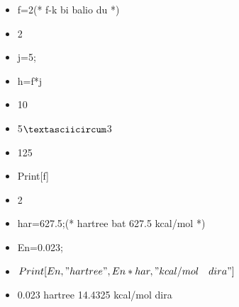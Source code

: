 \documentclass[xcolor=x11names,table]{beamer}
\begin{document}
\begin{frame}[fragile]
\begin{mdframed}[backgroundcolor=gray!05,roundcorner=2pt]
	\begin{itemize}
		\item<1-> f=2(* f-k bi balio du *)

		\item<2-> 2
		\item<3-> j=5;
		\item<3-> h=f*j

		\item<4-> 10

		\item<5-> 5$\textasciicircum$3

		\item<6-> 125

		\item<7-> Print[f]
		\item<8-> 2


		\item<9-> har=627.5;(* hartree bat 627.5 kcal/mol *)
		\item<9-> En=0.023;
		\item<9-> $ Print[En, " hartree ", En*har, " kcal/mol\quad dira "] $

		\item<10-> 0.023 hartree 14.4325 kcal/mol dira
	\end{itemize}
\end{mdframed}
\end{frame}




\end{document}
